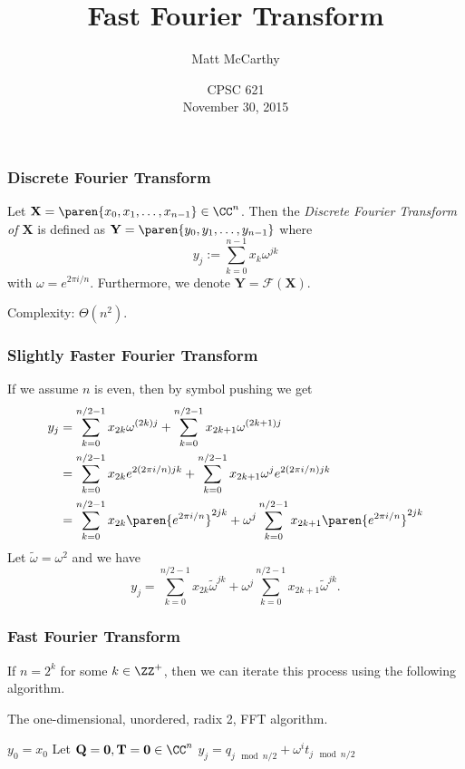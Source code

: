 \documentclass[xcolor=pdftex,dvipsnames,table]{presentation}
\def\ft{\mathcal{F}}
\begin{document}
\title[Fast Fourier Transform]
{
	Fast Fourier Transform
}
\author[McCarthy]
{
	Matt McCarthy
}
\date[]
{
	CPSC 621\\
	November 30, 2015
}

\frame{\titlepage}

\begin{frame}
	\frametitle{Discrete Fourier Transform}

	\begin{definition}
		Let $\mathbf{X}=\paren{x_0,x_1,\ldots,x_{n-1}}\in\CC^n$.
		Then the \textit{Discrete Fourier Transform of $\mathbf{X}$} is defined as $\mathbf{Y}=\paren{y_0,y_1,\ldots,y_{n-1}}$ where
		\[
			y_j:=\sum_{k=0}^{n-1}x_k \omega^{jk}
		\]
		with $\omega=e^{2\pi i/n}$.
		Furthermore, we denote $\mathbf{Y}=\ft(\mathbf{X})$.
	\end{definition}
	Complexity: $\Theta(n^2)$.
\end{frame}

\begin{frame}
	\frametitle{Slightly Faster Fourier Transform}
	If we assume $n$ is even, then by symbol pushing we get
	\begin{align*}
		y_j &=\sum_{k=0}^{n/2-1}x_{2k} \omega^{(2k)j} + \sum_{k=0}^{n/2-1}x_{2k+1}\omega^{(2k+1)j}\\
		&= \sum_{k=0}^{n/2-1}x_{2k} e^{2(2\pi i/n)jk} + \sum_{k=0}^{n/2-1}x_{2k+1}\omega^{j}e^{2(2\pi i/n)jk}\\
		&= \sum_{k=0}^{n/2-1}x_{2k} \paren{e^{2\pi i/n}}^{2jk} + \omega^{j}\sum_{k=0}^{n/2-1}x_{2k+1}\paren{e^{2\pi i/n}}^{2jk}
	\end{align*}
	Let $\tilde{\omega}=\omega^2$ and we have
	\[
		y_j = \sum_{k=0}^{n/2-1}x_{2k} {\tilde{\omega}}^{jk} + \omega^{j}\sum_{k=0}^{n/2-1}x_{2k+1}{\tilde{\omega}}^{jk}.
	\]
\end{frame}

\begin{frame}
	\frametitle{Fast Fourier Transform}

	If $n=2^k$ for some $k\in\ZZ^+$, then we can iterate this process using the following algorithm.

	The one-dimensional, unordered, radix 2, FFT algorithm.
	\begin{algorithmic}[1]
				\State $y_0=x_0$
			\Else
				\State Let $\mathbf{Q}=\mathbf{0},\mathbf{T}=\mathbf{0}\in\CC^n$
				\State {}
				\State {}
					\State $y_j=q_{j\mod{n/2}}+\omega^i t_{j\mod{n/2}}$
				\EndFor
			\EndIf
		\EndFunction
	\end{algorithmic}
\end{frame}
\end{document}
